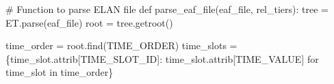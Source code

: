 \documentclass[
  letterpaper,
  DIV=11,
  numbers=noendperiod]{scrreprt}
\newenvironment{Shaded}{\begin{snugshade}}{\end{snugshade}}
\newcommand{\CommentTok}[1]{\textcolor[rgb]{0.37,0.37,0.37}{#1}}
\newcommand{\ControlFlowTok}[1]{\textcolor[rgb]{0.00,0.23,0.31}{#1}}
\newcommand{\KeywordTok}[1]{\textcolor[rgb]{0.00,0.23,0.31}{#1}}
\newcommand{\NormalTok}[1]{\textcolor[rgb]{0.00,0.23,0.31}{#1}}
\newcommand{\OperatorTok}[1]{\textcolor[rgb]{0.37,0.37,0.37}{#1}}
\newcommand{\StringTok}[1]{\textcolor[rgb]{0.13,0.47,0.30}{#1}}
\begin{document}
\begin{Shaded}
\begin{Highlighting}[]
\CommentTok{\# Function to parse ELAN file}
\KeywordTok{def}\NormalTok{ parse\_eaf\_file(eaf\_file, rel\_tiers):}
\NormalTok{    tree }\OperatorTok{=}\NormalTok{ ET.parse(eaf\_file)}
\NormalTok{    root }\OperatorTok{=}\NormalTok{ tree.getroot()}

\NormalTok{    time\_order }\OperatorTok{=}\NormalTok{ root.find(}\StringTok{\textquotesingle{}TIME\_ORDER\textquotesingle{}}\NormalTok{)}
\NormalTok{    time\_slots }\OperatorTok{=}\NormalTok{ \{time\_slot.attrib[}\StringTok{\textquotesingle{}TIME\_SLOT\_ID\textquotesingle{}}\NormalTok{]: time\_slot.attrib[}\StringTok{\textquotesingle{}TIME\_VALUE\textquotesingle{}}\NormalTok{] }\ControlFlowTok{for}\NormalTok{ time\_slot }\KeywordTok{in}\NormalTok{ time\_order\}}


\end{Highlighting}
\end{Shaded}
\end{document}
